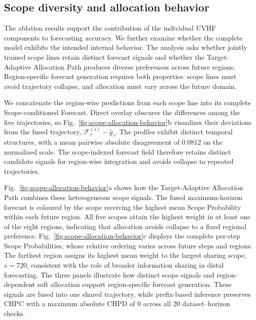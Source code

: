 \documentclass[final,3p,times]{elsarticle}
\begin{document}
\subsection{Scope diversity and allocation behavior}
\label{sec:scope-behavior}


The ablation results support the contribution of the individual UVHF components to forecasting accuracy. We further examine whether the complete model exhibits the intended internal behavior. The analysis asks whether jointly trained scope lines retain distinct forecast signals and whether the Target-Adaptive Allocation Path produces diverse preferences across future regions. Region-specific forecast generation requires both properties: scope lines must avoid trajectory collapse, and allocation must vary across the future domain.

We concatenate the region-wise predictions from each scope line into its complete Scope-conditioned Forecast. Direct overlay obscures the differences among the five trajectories, so Fig.~\ref{fig:scope-allocation-behavior}b visualizes their deviations from the fused trajectory, $\mathcal F_\tau^{(s)}-\widehat y_\tau$. The profiles exhibit distinct temporal structures, with a mean pairwise absolute disagreement of 0.0812 on the normalized scale. The scope-indexed forecast field therefore retains distinct candidate signals for region-wise integration and avoids collapse to repeated trajectories.

Fig.~\ref{fig:scope-allocation-behavior}a shows how the Target-Adaptive Allocation Path combines these heterogeneous scope signals. The fused maximum-horizon forecast is coloured by the scope receiving the highest mean Scope Probability within each future region. All five scopes attain the highest weight in at least one of the eight regions, indicating that allocation avoids collapse to a fixed regional preference. Fig.~\ref{fig:scope-allocation-behavior}c displays the complete per-step Scope Probabilities, whose relative ordering varies across future steps and regions. The farthest region assigns its highest mean weight to the largest sharing scope, $s=720$, consistent with the role of broader information sharing in distal forecasting. The three panels illustrate how distinct scope signals and region-dependent soft allocation support region-specific forecast generation. These signals are fused into one shared trajectory, while prefix-based inference preserves CHPC with a maximum absolute CHPD of 0 across all 20 dataset--horizon checks.
\end{document}
